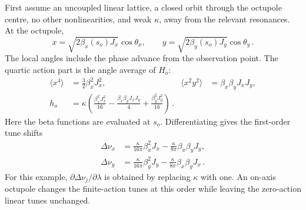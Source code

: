 First assume an uncoupled linear lattice, a closed orbit through the
octupole centre, no other nonlinearities, and weak $\kappa$, away from
the relevant resonances.  At the octupole,
\begin{equation}
    x = \sqrt{2\beta_x(s_o)J_x}\cos\theta_x,\qquad
    y = \sqrt{2\beta_y(s_o)J_y}\cos\theta_y\,.
\end{equation}
The local angles include the phase advance from the observation point.
The quartic action part is the angle average of $H_o$:
\begin{align}\label{eq:nnf-octupole-average}
    \langle x^4\rangle& = \frac32\beta_x^2J_x^2,
    &\langle x^2y^2\rangle& = \beta_x\beta_yJ_xJ_y,\\
    h_o& = \kappa\left(
    \frac{\beta_x^2J_x^2}{16}
    -\frac{\beta_x\beta_yJ_xJ_y}{4} + \frac{\beta_y^2J_y^2}{16}\right)\,.
\end{align}
Here the beta functions are evaluated at $s_o$.  Differentiating gives
the first-order tune shifts
\begin{align}\label{eq:nnf-octupole-detuning}
    \Delta\nu_x& = \frac{\kappa}{16\pi}\beta_x^2J_x
    -\frac{\kappa}{8\pi}\beta_x\beta_yJ_y,\\
    \Delta\nu_y& = \frac{\kappa}{16\pi}\beta_y^2J_y
    -\frac{\kappa}{8\pi}\beta_x\beta_yJ_x\,.
\end{align}
For this example, $\partial\Delta\nu_j/\partial\lambda$ is obtained by
replacing $\kappa$ with one.  An on-axis octupole changes the finite-action
tunes at this order while leaving the zero-action linear tunes unchanged.

